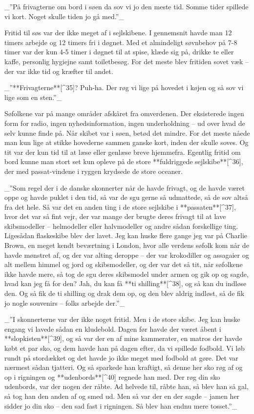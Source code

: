 \documentclass{book}
\begin{document}
 _”På frivagterne om bord i søen da sov vi jo den meste tid. Somme tider spillede vi kort.
 Noget skulle tiden jo gå med.”_

Fritid til søs var der ikke meget af i sejlskibene. I gennemsnit havde man 12 timers
arbejde og 12 timers fri i døgnet. Med et almindeligt søvnbehov på 7-8 timer var der kun
4-5 timer i døgnet til at spise, klæde sig på, drikke te eller kaffe, personlig hygiejne
samt toiletbesøg. For det meste blev fritiden sovet væk – der var ikke tid og kræfter til
andet.

 _”**Frivagterne**[^35]? Puh-ha. Der røg vi lige på hovedet i køjen og så sov vi lige som en sten.”_

Søfolkene var på mange områder afskåret fra omverdenen. Der eksisterede ingen form for
radio, ingen nyhedsinformation, ingen underholdning – ud over hvad de selv kunne finde på.
Når skibet var i søen, betød det mindre. For det meste nåede man kun lige at stikke
hovederne sammen ganske kort, inden der skulle soves. Og tit var der kun tid til at læse
eller genlæse breve hjemmefra. Egentlig fritid om bord kunne man stort set kun opleve på
de store **fuldriggede sejlskibe**[^36], der med passat-vindene i ryggen krydsede de store oceaner.

 _”Som regel der i de danske skonnerter når de havde frivagt, og de havde været oppe og
havde puklet i den tid, så var de sgu gerne så udmattede, så de sov altså fra det hele. Så
var det en anden ting i de store sejlskibe i **passaten**[^37], hvor det var så fint vejr, der var
mange der brugte deres frivagt til at lave skibsmodeller – helmodeller eller halvmodeller
og andre sådan forskellige ting. Ligesådan flaskeskibe blev der lavet. Jeg kan huske flere
gange jeg var på Charlie Brown, en meget kendt beværtning i London, hvor alle verdens
søfolk kom når de havde mønstret af, og der var alting deroppe – der var krokodiller og
assagaier og alt mellem himmel og jord og skibsmodeller, og der var det så tit, når
søfolkene ikke havde mere, så tog de sgu deres skibsmodel under armen og gik op og sagde,
hvad kan jeg få for den? Jah, du kan få **ti shilling**[^38], og så kan du indløse den. Og så fik
de ti shilling og drak dem op, og den blev aldrig indløst, så de fik jo nogle souvenirs –
folks arbejde der.”_

 _”I skonnerterne var der ikke noget fritid. Men i de store skibe. Jeg kan huske engang vi
lavede sådan en kludebold. Dagen før havde der været åbent i **slopkisten**[^39], og så var der en
af mine kammerater, en matros der havde købt et par sko, og dem havde han på dagen efter,
da vi spillede fodbold. Vi løb rundt på stordækket og det havde jo ikke meget med fodbold
at gøre. Det var nærmest sådan tjatteri. Og så sparkede han kraftigt, så denne her sko røg
af og op i rigningen og **udenbords**[^40] regnede han med. Der røg din sko udenbords, var der
nogen der råbte. Ad helvede til, råbte han, så blev han så gal, så tog han den anden af og
smed ud. Men så var der en der sagde – jamen her sidder jo din sko – den sad fast i
rigningen. Så blev han endnu mere tosset.”_
\end{document}
